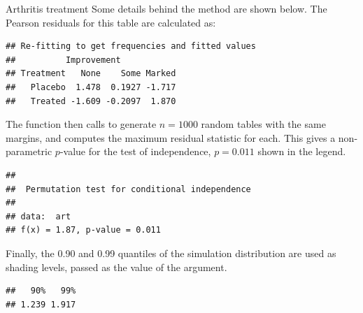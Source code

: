 \documentclass[11pt]{book}
\renewenvironment{knitrout}{\small\renewcommand{\baselinestretch}{.85}}{} %
\begin{document}
\begin{Example}{Arthritis treatment}
Some details behind the  method are shown below.  The Pearson residuals
for this table are calculated as:
\begin{knitrout}
\color{fgcolor}\begin{kframe}
\begin{alltt}
\hlstd{(}\hlstd{(}\hlopt{~} \hlopt{+}   \hlstd{=}\hlstd{)}
\end{alltt}
\begin{verbatim}
## Re-fitting to get frequencies and fitted values
##          Improvement
## Treatment   None    Some Marked
##   Placebo  1.478  0.1927 -1.717
##   Treated -1.609 -0.2097  1.870
\end{verbatim}
\end{kframe}
\end{knitrout}
The  function then calls  to generate
$n=1000$ random tables with the same margins, and computes the maximum residual statistic
for each.  This gives a non-parametric $p$-value for the test of independence,
$p =0.011$ 
shown in the legend.
\begin{knitrout}
\color{fgcolor}\begin{kframe}
\begin{alltt}
\hlstd{(}\hlstd{)}
 \hlkwb{<-} 
\end{alltt}
\begin{verbatim}
## 
## 	Permutation test for conditional independence
## 
## data:  art
## f(x) = 1.87, p-value = 0.011
\end{verbatim}
\end{kframe}
\end{knitrout}
Finally, the 0.90 and 0.99 quantiles of the simulation distribution are used as
shading levels, passed as the value of the  argument.
\begin{knitrout}
\color{fgcolor}\begin{kframe}
\begin{alltt}
\hlopt{$}\hlstd{(}\hlstd{(}\hlstd{,} \hlstd{))}
\end{alltt}
\begin{verbatim}
##   90%   99% 
## 1.239 1.917
\end{verbatim}
\end{kframe}
\end{knitrout}
\end{Example}
\end{document}
